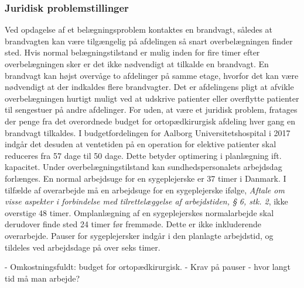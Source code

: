 \subsubsection{Juridisk problemstillinger}
Ved opdagelse af et belægningsproblem kontaktes en brandvagt, således at brandvagten kan være tilgængelig på afdelingen så snart overbelægningen finder sted. Hvis normal belægningstilstand er mulig inden for fire timer efter overbelægningen sker er det ikke nødvendigt at tilkalde en brandvagt. En brandvagt kan højst overvåge to afdelinger på samme etage, hvorfor det kan være nødvendigt at der indkaldes flere brandvagter. Det er afdelingens pligt at  afvikle overbelægningen hurtigt muligt ved at udskrive patienter eller overflytte patienter til sengestuer på andre afdelinger. \cite{Beredskab2016} For uden, at være et juridisk problem, fratages der penge fra det overordnede budget for ortopædkirurgisk afdeling hver gang en brandvagt tilkaldes. \cite{KILDE - er i tvivl om det går ud over den enkelte afdeling eller om det er samlet budget for sygehuset??} I budgetfordelingen for Aalborg Universitetshospital i 2017 indgår det desuden at ventetiden på en operation for elektive patienter skal reduceres fra 57 dage til 50 dage. \cite{Budget2016} Dette betyder optimering i planlægning ift. kapacitet. Under overbelægningstilstand kan sundhedspersonalets arbejdsdag forlænges. \cite{Kjeldsen2015} En normal arbejdsuge for en sygeplejerske er 37 timer i Danmark. \cite{Danske2015} I tilfælde af overarbejde må en arbejdsuge for en sygeplejerske ifølge, \textit {Aftale om visse aspekter i forbindelse med tilrettelæggelse af arbejdstiden, § 6, stk. 2}, ikke overstige 48 timer. Omplanlægning af en sygeplejerskes normalarbejde skal derudover finde sted 24 timer før fremmøde. Dette er ikke inkluderende overarbejde. Pauser for sygeplejersker indgår i den planlagte arbejdstid, og tildeles ved arbejdsdage på over seks timer. 







- Omkostningsfuldt: budget for ortopædkirurgisk.
- Krav på pauser - hvor langt tid må man arbejde?






